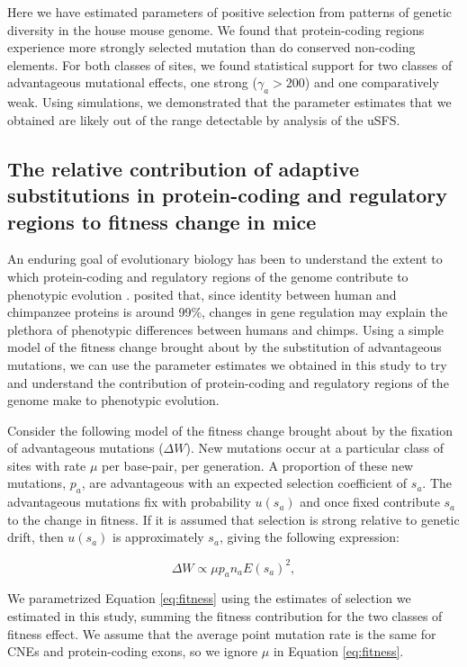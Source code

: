 \documentclass[11pt]{article}
\begin{document}
	Here we have estimated parameters of positive selection from patterns of genetic diversity in the house mouse genome. We found that protein-coding regions experience more strongly selected mutation than do conserved non-coding elements. For both classes of sites, we found statistical support for two classes of advantageous mutational effects, one strong ($\gamma_a > 200$) and one comparatively weak. Using simulations, we demonstrated that the parameter estimates that we obtained are likely out of the range detectable by analysis of the uSFS.
	
\subsection*{The relative contribution of adaptive substitutions in protein-coding and regulatory regions to fitness change in mice}

	An enduring goal of evolutionary biology has been to understand the extent to which protein-coding and regulatory regions of the genome contribute to phenotypic evolution \citep{RN347, RN346}. \cite{RN347} posited that, since identity between human and chimpanzee proteins is around 99\%, changes in gene regulation may explain the plethora of phenotypic differences between humans and chimps. Using a simple model of the fitness change brought about by the substitution of advantageous mutations, we can use the parameter estimates we obtained in this study to try and understand the contribution of protein-coding and regulatory regions of the genome make to phenotypic evolution.

	Consider the following model of the fitness change brought about by the fixation of advantageous mutations ($\Delta W$). New mutations occur at a particular class of sites with rate $\mu$ per base-pair, per generation. A proportion of these new mutations, $p_a$, are advantageous with an expected selection coefficient of $s_a$. The advantageous mutations fix with probability $u(s_a)$ and once fixed contribute $s_a$ to the change in fitness. If it is assumed that selection is strong relative to genetic drift, then $u(s_a)$ is approximately $s_a$, giving the following expression:

		\begin{equation}
		\label{eq:fitness}
		\Delta W \propto \mu p_a n_a E(s_a)^2,
		\end{equation}

	We parametrized Equation \ref{eq:fitness} using the estimates of selection we estimated in this study, summing the fitness contribution for the two classes of fitness effect. We assume that the average point mutation rate is the same for CNEs and protein-coding exons, so we ignore $\mu$ in Equation \ref{eq:fitness}. 
 
\end{document}
